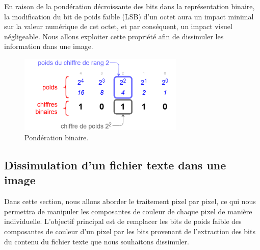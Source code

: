 \documentclass{article}
\begin{document}
En raison de la pondération décroissante des bits dans la représentation binaire, la modification du bit de poids faible (LSB) d'un octet aura un impact minimal sur la valeur numérique de cet octet, et par conséquent, un impact visuel négligeable. Nous allons exploiter cette propriété afin de dissimuler les information dans une image.
\begin{figure}[h]
  \centering
  \includegraphics[width=0.7\textwidth]{pon.png}
  \caption{Pondération binaire.}
\end{figure}

\subsection{Dissimulation d'un fichier texte dans une image}
Dans cette section, nous allons aborder le traitement pixel par pixel, ce qui nous permettra de manipuler les composantes de couleur de chaque pixel de manière individuelle. L'objectif principal est de remplacer les bits de poids faible des composantes de couleur d'un pixel par les bits provenant de l'extraction des bits du contenu du fichier texte que nous souhaitons dissimuler.
\end{document}
